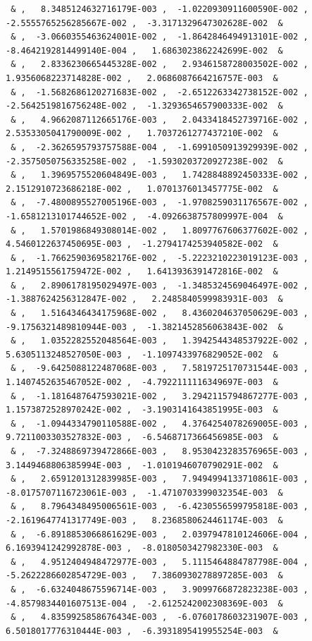 \documentclass[a4paper,10pt]{report}
\begin{document}
{\begin{verbatim}
 & ,   8.3485124632716179E-003 ,  -1.0220930911600590E-002 ,  -2.5555765256285667E-002 ,  -3.3171329647302628E-002  &
 & ,  -3.0660355463624001E-002 ,  -1.8642846494913101E-002 ,  -8.4642192814499140E-004 ,   1.6863023862242699E-002  &
 & ,   2.8336230665445328E-002 ,   2.9346158728003502E-002 ,   1.9356068223714828E-002 ,   2.0686087664216757E-003  &
 & ,  -1.5682686120271683E-002 ,  -2.6512263342738152E-002 ,  -2.5642519816756248E-002 ,  -1.3293654657900333E-002  &
 & ,   4.9662087112665176E-003 ,   2.0433418452739716E-002 ,   2.5353305041790009E-002 ,   1.7037261277437210E-002  &
 & ,  -2.3626595793757588E-004 ,  -1.6991050913929939E-002 ,  -2.3575050756335258E-002 ,  -1.5930203720927238E-002  &
 & ,   1.3969575520604849E-003 ,   1.7428848892450333E-002 ,   2.1512910723686218E-002 ,   1.0701376013457775E-002  &
 & ,  -7.4800895527005196E-003 ,  -1.9708259031176567E-002 ,  -1.6581213101744652E-002 ,  -4.0926638757809997E-004  &
 & ,   1.5701986849308014E-002 ,   1.8097767606377602E-002 ,   4.5460122637450695E-003 ,  -1.2794174253940582E-002  &
 & ,  -1.7662590369582176E-002 ,  -5.2223210223019123E-003 ,   1.2149515561759472E-002 ,   1.6413936391472816E-002  &
 & ,   2.8906178195029497E-003 ,  -1.3485324569046497E-002 ,  -1.3887624256312847E-002 ,   2.2485840599983931E-003  &
 & ,   1.5164346434175968E-002 ,   8.4360204637050629E-003 ,  -9.1756321489810944E-003 ,  -1.3821452856063843E-002  &
 & ,   1.0352282552048564E-003 ,   1.3942544348537922E-002 ,   5.6305113248527050E-003 ,  -1.1097433976829052E-002  &
 & ,  -9.6425088122487068E-003 ,   7.5819725170731544E-003 ,   1.1407452635467052E-002 ,  -4.7922111116349697E-003  &
 & ,  -1.1816487647593021E-002 ,   3.2942115794867277E-003 ,   1.1573872528970242E-002 ,  -3.1903141643851995E-003  &
 & ,  -1.0944334790110588E-002 ,   4.3764254078269005E-003 ,   9.7211003303527832E-003 ,  -6.5468717366456985E-003  &
 & ,  -7.3248869739472866E-003 ,   8.9530423283576965E-003 ,   3.1449468806385994E-003 ,  -1.0101946070790291E-002  &
 & ,   2.6591201312839985E-003 ,   7.9494994133710861E-003 ,  -8.0175707116723061E-003 ,  -1.4710703399032354E-003  &
 & ,   8.7964348495006561E-003 ,  -6.4230556599795818E-003 ,  -2.1619647741317749E-003 ,   8.2368580624461174E-003  &
 & ,  -6.8918853066861629E-003 ,   2.0397947810124606E-004 ,   6.1693941242992878E-003 ,  -8.0180503427982330E-003  &
 & ,   4.9512404948472977E-003 ,   5.1115464884787798E-004 ,  -5.2622286602854729E-003 ,   7.3860930278897285E-003  &
 & ,  -6.6324048675596714E-003 ,   3.9099766872823238E-003 ,  -4.8579834401607513E-004 ,  -2.6125242002308369E-003  &
 & ,   4.8359925858676434E-003 ,  -6.0760178603231907E-003 ,   6.5018017776310444E-003 ,  -6.3931895419955254E-003  &

\end{verbatim}}
\end{document}
